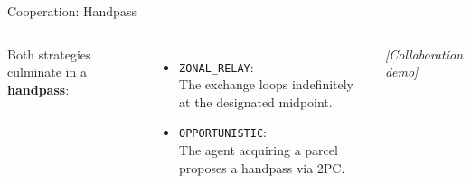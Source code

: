 \begin{frame}{Cooperation: Handpass}
  \begin{columns}
      Both strategies culminate in a \textbf{handpass}:
      \vspace{0.5em}
      \begin{itemize}
        \item \texttt{ZONAL\_RELAY}:\\ The exchange loops indefinitely at the designated midpoint.
        \vspace{0.5em}
        \item \texttt{OPPORTUNISTIC}:\\ The agent acquiring a parcel proposes a handpass via 2PC.
      \end{itemize}
      
      \begin{block}{}
        \centering\textit{[Collaboration demo]}
      \end{block}
  \end{columns}
\end{frame}